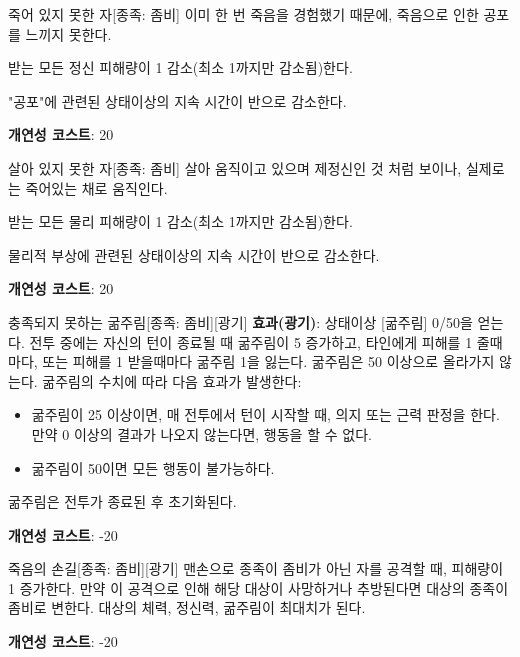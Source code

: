 \documentclass{report}
\begin{document}
	\begin{story}{죽어 있지 못한 자}{[종족: 좀비]}
		이미 한 번 죽음을 경험했기 때문에, 죽음으로 인한 공포를 느끼지 못한다.
		
		받는 모든 정신 피해량이 1 감소(최소 1까지만 감소됨)한다.
		
		"공포"에 관련된 상태이상의 지속 시간이 반으로 감소한다.
		
		\smallskip
		
		\textbf{개연성 코스트}: 20
	\end{story}
	
	\begin{story}{살아 있지 못한 자}{[종족: 좀비]}
		살아 움직이고 있으며 제정신인 것 처럼 보이나, 실제로는 죽어있는 채로 움직인다.
		
		받는 모든 물리 피해량이 1 감소(최소 1까지만 감소됨)한다.
		
		물리적 부상에 관련된 상태이상의 지속 시간이 반으로 감소한다.
		
		\smallskip
		
		\textbf{개연성 코스트}: 20
	\end{story}
	
	\begin{story}{충족되지 못하는 굶주림}{[종족: 좀비][광기]}
		\textbf{효과(광기)}: 상태이상 [굶주림] 0/50을 얻는다. 전투 중에는 자신의 턴이 종료될 때 굶주림이 5 증가하고, 타인에게 피해를 1 줄때마다, 또는 피해를 1 받을때마다 굶주림 1을 잃는다. 굶주림은 50 이상으로 올라가지 않는다. 굶주림의 수치에 따라 다음 효과가 발생한다:
		\begin{itemize}
			\item 굶주림이 25 이상이면, 매 전투에서 턴이 시작할 때, 의지 또는 근력 판정을 한다. 만약 0 이상의 결과가 나오지 않는다면, 행동을 할 수 없다.
			\item 굶주림이 50이면 모든 행동이 불가능하다.
		\end{itemize}
		굶주림은 전투가 종료된 후 초기화된다.
		
		\smallskip
		
		\textbf{개연성 코스트}: -20
	\end{story}
	
	\begin{story}{죽음의 손길}{[종족: 좀비][광기]}
		맨손으로 종족이 좀비가 아닌 자를 공격할 때, 피해량이 1 증가한다. 만약 이 공격으로 인해 해당 대상이 사망하거나 추방된다면 대상의 종족이 좀비로 변한다. 대상의 체력, 정신력, 굶주림이 최대치가 된다.
		
		\smallskip
		
		\textbf{개연성 코스트}: -20
	\end{story}
\end{document}
